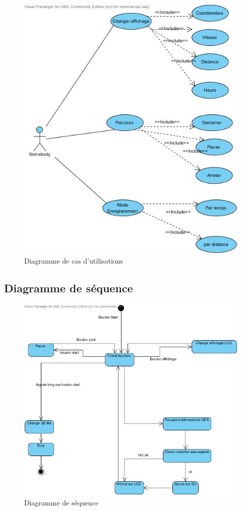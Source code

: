 \documentclass[a4paper,12pt,titlepage]{article}
\begin{document}
\begin{figure}[H]
	\centering
	\includegraphics[width=\textwidth]{use_case.jpg}
	\caption{Diagramme de cas d'utilisations}
	\label{usecase}
\end{figure}

\subsection{Diagramme de séquence}

\begin{figure}[H]
	\centering
	\includegraphics[width=\textwidth]{sequence.jpg}
	\caption{Diagramme de séquence}
	\label{sequence}
\end{figure}
\end{document}
